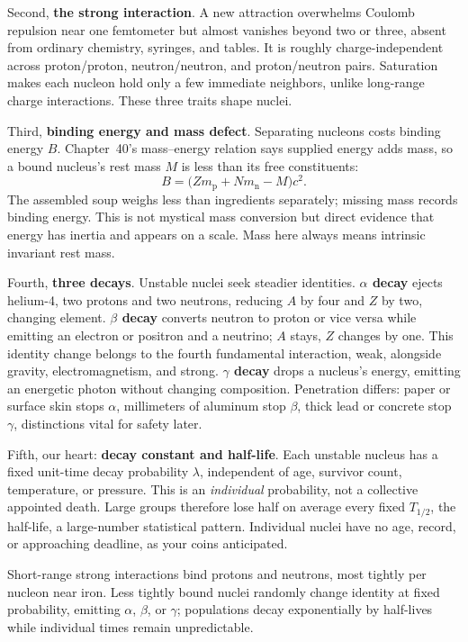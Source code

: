 Second, \textbf{the strong interaction}. A new attraction overwhelms Coulomb repulsion near one femtometer but almost vanishes beyond two or three, absent from ordinary chemistry, syringes, and tables. It is roughly charge-independent across proton/proton, neutron/neutron, and proton/neutron pairs. Saturation makes each nucleon hold only a few immediate neighbors, unlike long-range charge interactions. These three traits shape nuclei.

Third, \textbf{binding energy and mass defect}. Separating nucleons costs binding energy \(B\). Chapter~40's mass--energy relation says supplied energy adds mass, so a bound nucleus's rest mass \(M\) is less than its free constituents:
\[
B=\bigl(Zm_{\mathrm p}+Nm_{\mathrm n}-M\bigr)c^{2}.
\]
The assembled soup weighs less than ingredients separately; missing mass records binding energy. This is not mystical mass conversion but direct evidence that energy has inertia and appears on a scale. Mass here always means intrinsic invariant rest mass.

Fourth, \textbf{three decays}. Unstable nuclei seek steadier identities. \textbf{\(\alpha\) decay} ejects helium-4, two protons and two neutrons, reducing \(A\) by four and \(Z\) by two, changing element. \textbf{\(\beta\) decay} converts neutron to proton or vice versa while emitting an electron or positron and a neutrino; \(A\) stays, \(Z\) changes by one. This identity change belongs to the fourth fundamental interaction, weak, alongside gravity, electromagnetism, and strong. \textbf{\(\gamma\) decay} drops a nucleus's energy, emitting an energetic photon without changing composition. Penetration differs: paper or surface skin stops \(\alpha\), millimeters of aluminum stop \(\beta\), thick lead or concrete stop \(\gamma\), distinctions vital for safety later.

Fifth, our heart: \textbf{decay constant and half-life}. Each unstable nucleus has a fixed unit-time decay probability \(\lambda\), independent of age, survivor count, temperature, or pressure. This is an \emph{individual} probability, not a collective appointed death. Large groups therefore lose half on average every fixed \(T_{1/2}\), the half-life, a large-number statistical pattern. Individual nuclei have no age, record, or approaching deadline, as your coins anticipated.


\begin{oneline}
Short-range strong interactions bind protons and neutrons, most tightly per nucleon near iron. Less tightly bound nuclei randomly change identity at fixed probability, emitting \(\alpha\), \(\beta\), or \(\gamma\); populations decay exponentially by half-lives while individual times remain unpredictable.
\end{oneline}

